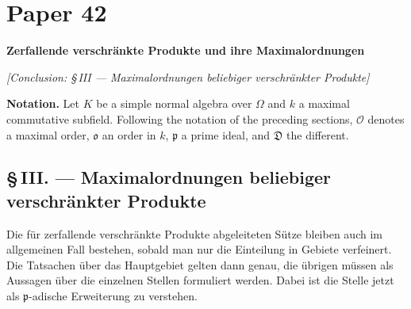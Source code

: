 \documentclass[10pt,a4paper]{article}
\theoremstyle{plain}
\theoremstyle{definition}
\theoremstyle{remark}
\newcommand{\ido}{\mathfrak{o}}
\newcommand{\idp}{\mathfrak{p}}
\newcommand{\idD}{\mathfrak{D}}
\newcommand{\calO}{\mathcal{O}}
\begin{document}
\renewenvironment{noetherpaper}[4]{\newpage\section*{#1}\addcontentsline{toc}{section}{#1}\par\smallskip}{\par\medskip}


\newpage

\section*{Paper 42}

\begin{center}
\Large\bfseries Zerfallende verschr\"ankte Produkte und ihre Maximalordnungen
\end{center}

\begin{center}\textit{[Conclusion: \S\,III --- Maximalordnungen beliebiger verschr\"ankter Produkte]}\end{center}

\medskip
\noindent\textbf{Notation.} Let $K$ be a simple normal algebra over $\Omega$ and $k$ a
maximal commutative subfield. Following the notation of the preceding sections,
$\calO$ denotes a maximal order, $\ido$ an order in $k$, $\idp$ a prime ideal,
and $\idD$ the different.

\subsection*{\S\,III. --- Maximalordnungen beliebiger verschr\"ankter Produkte}

Die f\"ur zerfallende verschr\"ankte Produkte abgeleiteten S\"utze bleiben auch im allgemeinen Fall bestehen, sobald man nur die Einteilung in Gebiete verfeinert. Die Tatsachen \"uber das Hauptgebiet gelten dann genau, die \"ubrigen m{\"u}ssen als Aussagen \"uber die einzelnen Stellen formuliert werden. Dabei ist die Stelle jetzt als $\idp$-adische Erweiterung zu verstehen.
\end{document}
